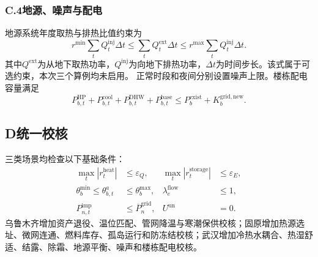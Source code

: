 \subsubsection*{C.4\quad 地源、噪声与配电}

地源系统年度取热与排热比值约束为
\begin{equation}
r^{\min}\sum_tQ_t^{\mathrm{inj}}\Delta t
\leq\sum_tQ_t^{\mathrm{ext}}\Delta t
\leq r^{\max}\sum_tQ_t^{\mathrm{inj}}\Delta t.
\end{equation}
其中$Q^{\mathrm{ext}}$为从地下取热功率，$Q^{\mathrm{inj}}$为向地下排热功率，$\Delta t$为时间步长。该式属于可选约束，本次三个算例均未启用。
正常时段和夜间分别设置噪声上限。楼栋配电容量满足
\begin{equation}
P_{b,t}^{\mathrm{HP}}+P_{b,t}^{\mathrm{cool}}+P_{b,t}^{\mathrm{DHW}}+P_{b,t}^{\mathrm{base}}
\leq P_b^{\mathrm{exist}}+K_b^{\mathrm{grid,new}}.
\end{equation}

\subsection*{D\quad 统一校核}

三类场景均检查以下基础条件：
\begin{align}
\max_t|r_t^{\mathrm{heat}}|&\leq\varepsilon_Q,&
\max_t|r_t^{\mathrm{storage}}|&\leq\varepsilon_E,\\
\theta_b^{\min}\leq\theta_{b,t}^{a}&\leq\theta_b^{\max},&
\lambda_e^{\mathrm{flow}}&\leq1,\\
P_{n,t}^{\mathrm{imp}}&\leq\overline P_n^{\mathrm{grid}},&
U^{\mathrm{un}}&=0.
\end{align}
乌鲁木齐增加资产退役、温位匹配、管网降温与寒潮保供校核；固原增加热源选址、微网连通、燃料库存、孤岛运行和防冻结校核；武汉增加冷热水耦合、热湿舒适、结露、除霜、地源平衡、噪声和楼栋配电校核。
